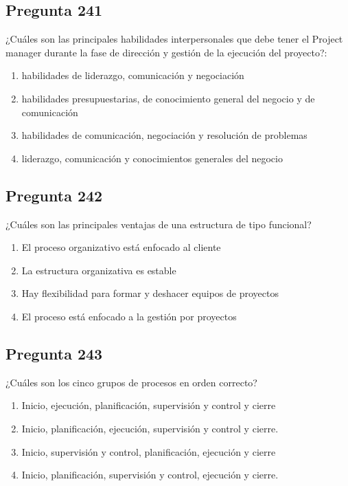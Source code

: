 \documentclass[11pt,a4paper]{article}
\begin{document}
\subsection*{Pregunta 241}
¿Cuáles son las principales habilidades interpersonales que debe tener el Project manager durante la fase de dirección y gestión de la ejecución del proyecto?:

\begin{enumerate}[label=\alph*)]
  \item habilidades de liderazgo, comunicación y negociación
  \item habilidades presupuestarias, de conocimiento general del negocio y de comunicación
  \item habilidades de comunicación, negociación y resolución de problemas
  \item liderazgo, comunicación y conocimientos generales del negocio
\end{enumerate}

\subsection*{Pregunta 242}
¿Cuáles son las principales ventajas de una estructura de tipo funcional?

\begin{enumerate}[label=\alph*)]
  \item El proceso organizativo está enfocado al cliente
  \item La estructura organizativa es estable
  \item Hay flexibilidad para formar y deshacer equipos de proyectos
  \item El proceso está enfocado a la gestión por proyectos
\end{enumerate}

\subsection*{Pregunta 243}
¿Cuáles son los cinco grupos de procesos en orden correcto?

\begin{enumerate}[label=\alph*)]
  \item Inicio, ejecución, planificación, supervisión y control y cierre
  \item Inicio, planificación, ejecución, supervisión y control y cierre.
  \item Inicio, supervisión y control, planificación, ejecución y cierre
  \item Inicio, planificación, supervisión y control, ejecución y cierre.
\end{enumerate}
\end{document}
